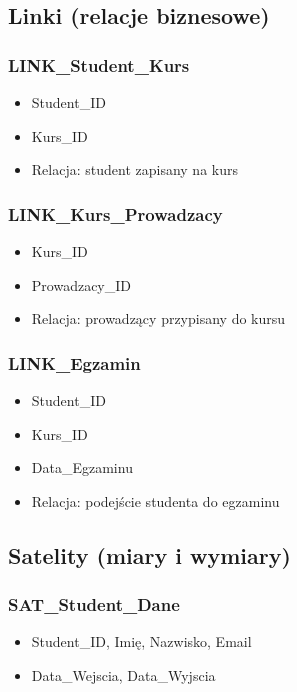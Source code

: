 \documentclass{article}
\begin{document}
\subsection{Linki (relacje biznesowe)}

\subsubsection*{LINK\_Student\_Kurs}
\begin{itemize}
  \item Student\_ID
  \item Kurs\_ID
  \item Relacja: student zapisany na kurs
\end{itemize}

\subsubsection*{LINK\_Kurs\_Prowadzacy}
\begin{itemize}
  \item Kurs\_ID
  \item Prowadzacy\_ID
  \item Relacja: prowadzący przypisany do kursu
\end{itemize}

\subsubsection*{LINK\_Egzamin}
\begin{itemize}
  \item Student\_ID
  \item Kurs\_ID
  \item Data\_Egzaminu
  \item Relacja: podejście studenta do egzaminu
\end{itemize}

\subsection{Satelity (miary i wymiary)}

\subsubsection*{SAT\_Student\_Dane}
\begin{itemize}
  \item Student\_ID, Imię, Nazwisko, Email
  \item Data\_Wejscia, Data\_Wyjscia
\end{itemize}
\end{document}
